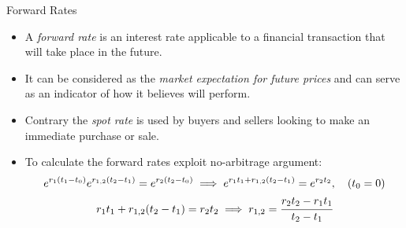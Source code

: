 \documentclass{beamer}
\begin{document}
%

\begin{frame}{Forward Rates}
  \begin{itemize}
  \item A \emph{forward rate} is an interest rate applicable to a financial transaction that will take place in the future.
  \item It can be considered as the \emph{market expectation for future prices} and can serve as an indicator of how it believes will perform.
  \item Contrary the \emph{spot rate} is used by buyers and sellers looking to make an immediate purchase or sale.
  \item To calculate the forward rates exploit no-arbitrage argument:
    \begin{equation}
      \begin{gathered}
        e^{r_1 (t_1-t_0)}e^{r_{1,2}(t_2 - t_1)} = e^{r_2 (t_2-t_0)} \implies e^{r_1 t_1 + r_{1,2}(t_2 - t_1)} = e^{r_2 t_2}, \quad(t_0=0) \\
        r_1 t_1 + r_{1,2}(t_2 - t_1) = r_2 t_2 \implies r_{1,2} = \cfrac{r_2 t_2 - r_1 t_1 }{t_2 - t_1}
      \end{gathered}
    \end{equation}
  \end{itemize}
\end{frame}
\end{document}

